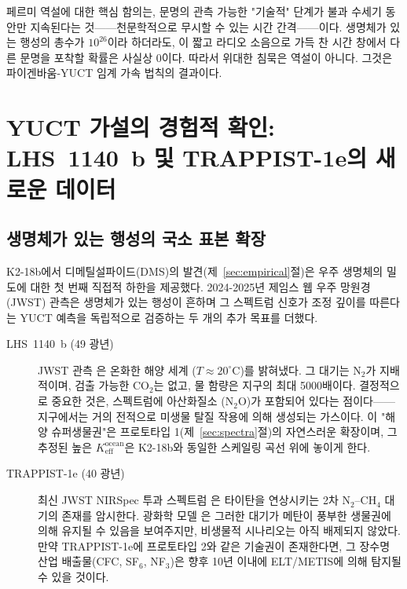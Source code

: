 \documentclass[11pt,a4paper]{article}
\begin{document}
	페르미 역설에 대한 핵심 함의는, 문명의 관측 가능한 "기술적" 단계가 불과 수세기 동안만 지속된다는 것——천문학적으로 무시할 수 있는 시간 간격——이다. 생명체가 있는 행성의 총수가 \(10^{26}\)이라 하더라도, 이 짧고 라디오 소음으로 가득 찬 시간 창에서 다른 문명을 포착할 확률은 사실상 0이다. 따라서 위대한 침묵은 역설이 아니다. 그것은 파이겐바움-YUCT 임계 가속 법칙의 결과이다.
	
	\section{YUCT 가설의 경험적 확인: LHS~1140~b 및 TRAPPIST-1e의 새로운 데이터}
	\label{sec:confirmation}
	
	\subsection{생명체가 있는 행성의 국소 표본 확장}
	K2-18b에서 디메틸설파이드(DMS)의 발견(제~\ref{sec:empirical}절)은 우주 생명체의 밀도에 대한 첫 번째 직접적 하한을 제공했다. 2024-2025년 제임스 웹 우주 망원경(JWST) 관측은 생명체가 있는 행성이 흔하며 그 스펙트럼 신호가 조정 깊이를 따른다는 YUCT 예측을 독립적으로 검증하는 두 개의 추가 목표를 더했다.
	
	\begin{description}
		\item[LHS~1140~b (49 광년)] JWST 관측 \citep{Damiano2025}은 온화한 해양 세계 (\(T\approx 20^{\circ}\mathrm{C}\))를 밝혀냈다. 그 대기는 N$_2$가 지배적이며, 검출 가능한 CO$_2$는 없고, 물 함량은 지구의 최대 5000배이다. 결정적으로 중요한 것은, 스펙트럼에 아산화질소 (N$_2$O)가 포함되어 있다는 점이다——지구에서는 거의 전적으로 미생물 탈질 작용에 의해 생성되는 가스이다. 이 "해양 슈퍼생물권"은 프로토타입 1(제~\ref{sec:spectra}절)의 자연스러운 확장이며, 그 추정된 높은 \(K_{\mathrm{eff}}^{\mathrm{ocean}}\)은 K2-18b와 동일한 스케일링 곡선 위에 놓이게 한다.
		\item[TRAPPIST-1e (40 광년)] 최신 JWST NIRSpec 투과 스펙트럼 \citep{Glidden2025}은 타이탄을 연상시키는 2차 N$_2$–CH$_4$ 대기의 존재를 암시한다. 광화학 모델 \citep{EagerNash2025}은 그러한 대기가 메탄이 풍부한 생물권에 의해 유지될 수 있음을 보여주지만, 비생물적 시나리오는 아직 배제되지 않았다. 만약 TRAPPIST-1e에 프로토타입 2와 같은 기술권이 존재한다면, 그 장수명 산업 배출물(CFC, SF$_6$, NF$_3$)은 향후 10년 이내에 ELT/METIS에 의해 탐지될 수 있을 것이다.
	\end{description}
	
\end{document}
